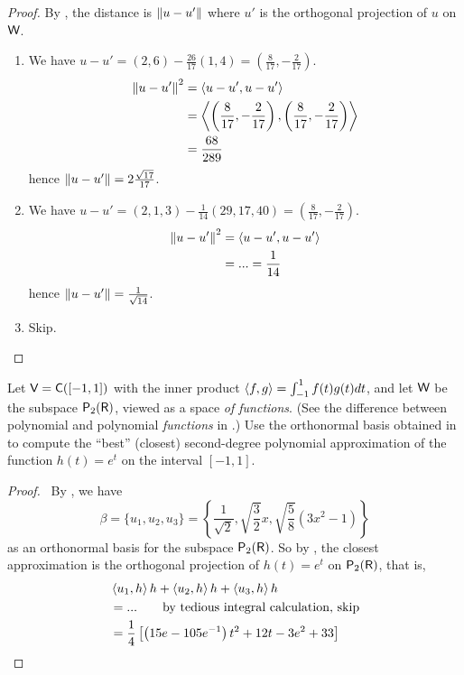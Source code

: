 \begin{proof}
By , the distance is \(\left\lVert u - u'\right\rVert\) where \(u'\) is the orthogonal projection of \(u\) on \(\textsf{W}\).
\begin{enumerate}
\item We have \(u - u' = (2, 6) - \frac{26}{17}(1, 4) = \left( \frac{8}{17}, -\frac{2}{17} \right)\).
\begin{align*}
    \left\lVert u - u'\right\rVert^2 & = \left< u - u', u - u' \right> \\
        & = \left< \left( \frac{8}{17}, -\frac{2}{17} \right), \left( \frac{8}{17}, -\frac{2}{17} \right) \right> \\
        & = \frac{68}{289}
\end{align*}
hence \(\left\lVert u - u'\right\rVert = 2 \frac{\sqrt{17}}{17}\).

\item We have \(u - u' = (2, 1, 3) - \frac{1}{14}(29, 17, 40) = \left( \frac{8}{17}, -\frac{2}{17} \right)\).
\begin{align*}
    \left\lVert u - u'\right\rVert^2 & = \left< u - u', u - u' \right> \\
        & = ... = \frac{1}{14}
\end{align*}
hence \(\left\lVert u - u'\right\rVert = \frac{1}{\sqrt{14}}\).

\item Skip.
\end{enumerate}
\end{proof}

\begin{exercise} \label{exercise 6.2.21}
Let \(\textsf{V} = \textsf{C}([-1, 1])\) with the inner product \(\left< f,g \right> = \int_{-1}^1 f(t)g(t) dt\), and let \(\textsf{W}\) be the subspace \(\textsf{P}_2(\textsf{R})\), viewed as a space \emph{of functions}.
(See the difference between polynomial and polynomial \emph{functions} in .)
Use the orthonormal basis obtained in  to compute the ``best'' (closest) second-degree polynomial approximation of the function \(h(t) = e^t\) on the interval \([-1, 1]\).
\end{exercise}

\begin{proof} \ 
By , we have
\[
    \beta = \{ u_1, u_2, u_3 \} =
    \left\{
        \frac{1}{\sqrt{2}},
        \sqrt{\frac{3}{2}} x,
        \sqrt{\frac{5}{8}}(3x^2 - 1)
    \right\}
\]
as an orthonormal basis for the subspace \(\textsf{P}_2(\textsf{R})\).
So by , the closest approximation is the orthogonal projection of \(h(t) = e^t\) on \(\textsf{P}_2(\textsf{R})\), that is,
\begin{align*}
    & \left< u_1, h \right> h + \left< u_2, h \right> h + \left< u_3, h \right> h \\
    & = ... \quad \quad \text{by tedious integral calculation, skip} \\
    & = \frac{1}{4} \left[\left(15 e - 105 e^{-1}\right) t^2 + 12t - 3e^{2} + 33 \right]
\end{align*}
\end{proof}

